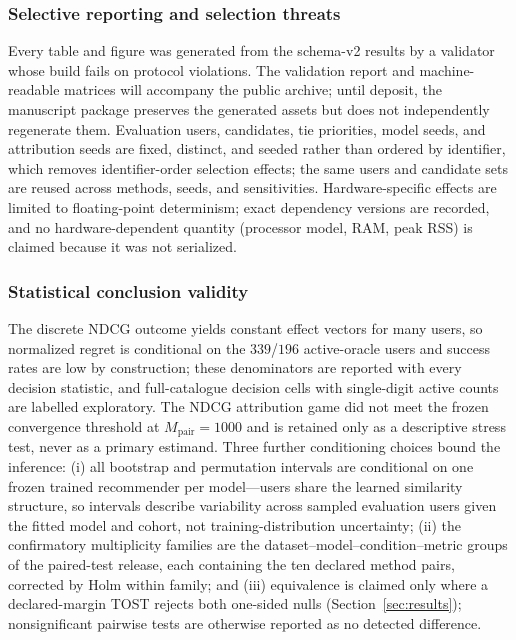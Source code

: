 \documentclass[a4paper,fleqn,doubleblind]{cas-sc}
\begin{document}
\subsubsection{Selective reporting and selection threats}
Every table and figure was generated from the schema-v2 results by a validator whose build fails on protocol violations. The validation report and machine-readable matrices will accompany the public archive; until deposit, the manuscript package preserves the generated assets but does not independently regenerate them. Evaluation users, candidates, tie priorities, model seeds, and attribution seeds are fixed, distinct, and seeded rather than ordered by identifier, which removes identifier-order selection effects; the same users and candidate sets are reused across methods, seeds, and sensitivities. Hardware-specific effects are limited to floating-point determinism; exact dependency versions are recorded, and no hardware-dependent quantity (processor model, RAM, peak RSS) is claimed because it was not serialized.

\subsubsection{Statistical conclusion validity}
The discrete NDCG outcome yields constant effect vectors for many users, so normalized regret is conditional on the $339$/$196$ active-oracle users and success rates are low by construction; these denominators are reported with every decision statistic, and full-catalogue decision cells with single-digit active counts are labelled exploratory. The NDCG attribution game did not meet the frozen convergence threshold at $M_{\mathrm{pair}}=1000$ and is retained only as a descriptive stress test, never as a primary estimand. Three further conditioning choices bound the inference: (i) all bootstrap and permutation intervals are conditional on one frozen trained recommender per model---users share the learned similarity structure, so intervals describe variability across sampled evaluation users given the fitted model and cohort, not training-distribution uncertainty; (ii) the confirmatory multiplicity families are the dataset--model--condition--metric groups of the paired-test release, each containing the ten declared method pairs, corrected by Holm within family; and (iii) equivalence is claimed only where a declared-margin TOST rejects both one-sided nulls (Section~\ref{sec:results}); nonsignificant pairwise tests are otherwise reported as no detected difference.
\end{document}
